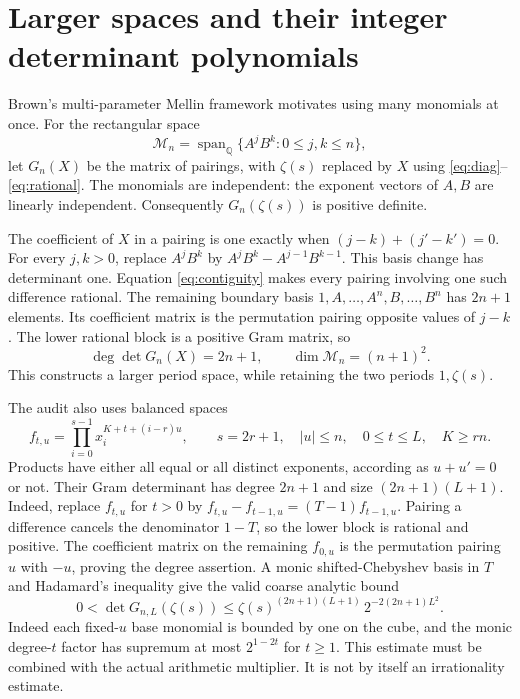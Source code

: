 \documentclass[11pt]{article}
\newcommand{\Q}{\mathbb Q}
\begin{document}
\section{Larger spaces and their integer determinant polynomials}
Brown's multi-parameter Mellin framework \cite{Brown} motivates using
many monomials at once. For the rectangular space
\[
 \mathcal M_n=\operatorname{span}_{\Q}
             \{A^jB^k:0\le j,k\le n\},
\]
let $G_n(X)$ be the matrix of pairings, with $\zeta(s)$ replaced by $X$
using \eqref{eq:diag}--\eqref{eq:rational}.
The monomials are independent: the exponent vectors of $A,B$ are
linearly independent. Consequently $G_n(\zeta(s))$ is positive definite.

The coefficient of $X$ in a pairing is one exactly when
$(j-k)+(j'-k')=0$. For every $j,k>0$, replace $A^jB^k$ by
$A^jB^k-A^{j-1}B^{k-1}$. This basis change has determinant one.
Equation \eqref{eq:contiguity} makes every pairing involving one such
difference rational. The remaining boundary basis
$1,A,\ldots,A^n,B,\ldots,B^n$ has $2n+1$ elements. Its coefficient
matrix is the permutation pairing opposite values of $j-k$.
The lower rational block is a positive Gram matrix, so
\[
 \deg\det G_n(X)=2n+1,
 \qquad \dim\mathcal M_n=(n+1)^2.
\]
This constructs a larger period space, while retaining the two periods
$1,\zeta(s)$.

The audit also uses balanced spaces
\[
 f_{t,u}=\prod_{i=0}^{s-1}
          x_i^{K+t+(i-r)u},\qquad
 s=2r+1,\quad |u|\le n,\quad 0\le t\le L,\quad K\ge rn .
\]
Products have either all equal or all distinct exponents, according as
$u+u'=0$ or not. Their Gram determinant has degree $2n+1$ and size
$(2n+1)(L+1)$. Indeed, replace $f_{t,u}$ for $t>0$ by
$f_{t,u}-f_{t-1,u}=(T-1)f_{t-1,u}$. Pairing a difference cancels
the denominator $1-T$, so the lower block is rational and positive.
The coefficient matrix on the remaining $f_{0,u}$ is the permutation
pairing $u$ with $-u$, proving the degree assertion.
A monic shifted-Chebyshev basis in $T$ and Hadamard's
inequality give the valid coarse analytic bound
\[
 0<\det G_{n,L}(\zeta(s))
   \le \zeta(s)^{(2n+1)(L+1)}\,2^{-2(2n+1)L^2}.
\]
Indeed each fixed-$u$ base monomial is bounded by one on the cube, and
the monic degree-$t$ factor has supremum at most $2^{1-2t}$ for $t\ge1$.
This estimate must be combined with the actual arithmetic multiplier.
It is not by itself an irrationality estimate.
\end{document}
